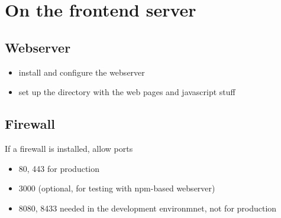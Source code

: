 \documentclass[oneside, english, final]{design}
\begin{document}
\section{On the frontend server}
\subsection{Webserver}
\begin{itemize}
\item{install and configure the webserver}
\item{set up the directory with the web pages and javascript stuff}
\end{itemize}

\subsection{Firewall}
If a firewall is installed, allow ports
\begin{itemize}
\item{80, 443 for production} 
\item{3000 (optional, for testing with npm-based webserver)}
\item{8080, 8433 needed in the development environmnet, not for production}
\end{itemize}
\end{document}
